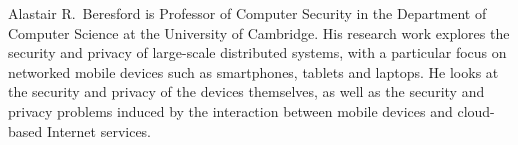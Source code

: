 \documentclass[10pt,journal,compsoc]{IEEEtran}
\begin{document}
\begin{IEEEbiography}{Alastair R.\ Beresford}
is Professor of Computer Security in the Department of Computer Science at the University of Cambridge. His research work explores the security and privacy of large-scale distributed systems, with a particular focus on networked mobile devices such as smartphones, tablets and laptops. He looks at the security and privacy of the devices themselves, as well as the security and privacy problems induced by the interaction between mobile devices and cloud-based Internet services.
\end{IEEEbiography}
\vfill
\end{document}
